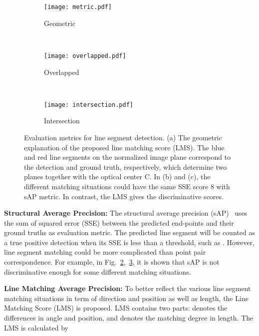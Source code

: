 \documentclass[runningheads]{llncs}
\begin{document}
\begin{figure}[t]
    \centering
    \begin{subfigure}[b]{0.3\textwidth}
         \centering
         \texttt{[image: metric.pdf]}
         \caption{\centering Geometric}
         \label{sub_fig:metric}
     \end{subfigure}
     ~~
     \begin{subfigure}[b]{0.3\textwidth}
         \centering
         \texttt{[image: overlapped.pdf]}
         \caption{\centering Overlapped}
         \label{sub_fig:overlapped}
     \end{subfigure}
    ~~
    \begin{subfigure}[b]{0.3\textwidth}
         \centering
         \texttt{[image: intersection.pdf]}
         \caption{\centering Intersection}
         \label{sub_fig:intersection}
    \end{subfigure}

    \caption{Evaluation metrics for line segment detection. (a) The geometric explanation of the proposed line matching score (LMS). The blue and red line segments on the normalized image plane correspond to the detection and ground truth, respectively, which determine two planes together with the optical center C. In (b) and (c), the different matching situations could have the same SSE score 8 with sAP metric. In contrast, the LMS gives the discriminative scores.}
    \label{sap}
\end{figure}



\textbf{Structural Average Precision:} The structural average precision (sAP)~\cite{LCNN} uses the sum of squared error (SSE) between the predicted end-points and their ground truths as evaluation metric. The predicted line segment will be counted as a true positive detection when its SSE is less than a threshold, such as . However, line segment matching could be more complicated than point pair correspondence. For example, in Fig.~\ref{sub_fig:overlapped},~\ref{sub_fig:intersection}, it is shown that sAP is not discriminative enough for some different matching situations.

\textbf{Line Matching Average Precision:}\label{line_matching_metric2}
To better reflect the various line segment matching situations in term of direction and position as well as length, the Line Matching Score (LMS) is proposed. LMS contains two parts:  denotes the differences in angle and position, and  denotes the matching degree in length. The LMS is calculated by 
\end{document}
